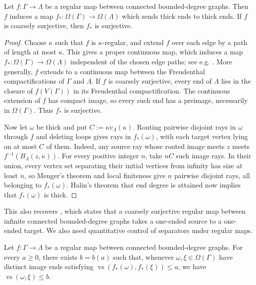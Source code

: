 \documentclass[a4paper]{amsart}
\begin{document}
\begin{lemma}\label{lem:regular-map-on-ends}
Let $f:\Gamma\to\Lambda$ be a regular map between connected bounded-degree graphs. Then $f$ induces a map $f_*:\Omega(\Gamma)\to\Omega(\Lambda)$ which sends thick ends to thick ends. If $f$ is coarsely surjective, then $f_*$ is surjective.
\end{lemma}

\begin{proof}
Choose $\kappa$ such that $f$ is $\kappa$-regular, and extend $f$ over each edge by a path of length at most $\kappa$. This gives a proper continuous map, which induces a map $f_*:\Omega(\Gamma)\to\Omega(\Lambda)$ independent of the chosen edge paths; see e.g. \cite[Prop.~I.9.11]{baues2001infinite}. More generally, $f$ extends to a continuous map between the Freudenthal compactifications of $\Gamma$ and $\Lambda$. 
If $f$ is coarsely surjective, every end of $\Lambda$ lies in the closure of $f(V(\Gamma))$ in its Freudenthal compactification. The continuous extension of $f$ has compact image, so every such end has a preimage, necessarily in $\Omega(\Gamma)$. Thus $f_*$ is surjective.

Now let $\omega$ be thick and put $C:=\kappa v_\Lambda(\kappa)$. Routing pairwise disjoint rays in $\omega$ through $f$ and deleting loops gives rays in $f_*(\omega)$, with each target vertex lying on at most $C$ of them. Indeed, any source ray whose routed image meets $z$ meets $f^{-1}(B_\Lambda(z,\kappa))$. For every positive integer $n$, take $nC$ such image rays. In their union, every vertex set separating their initial vertices from infinity has size at least $n$, so Menger's theorem and local finiteness give $n$ pairwise disjoint rays, all belonging to $f_*(\omega)$. Halin's theorem that end degree is attained \cite[p.~241]{diestel2025graph} now implies that $f_*(\omega)$ is thick.
\end{proof}

This also recovers \cite[Lem.~3.9]{mackay2026almost}, which states that a coarsely surjective regular map between infinite connected bounded-degree graphs takes a one-ended source to a one-ended target.
We also need quantitative control of separators under regular maps.

\begin{lemma}\label{lem:regular-end-separators}
Let $f:\Gamma\to\Lambda$ be a regular map between connected bounded-degree graphs.
For every $a\geq0$, there exists $b=b(a)$ such that, whenever $\omega,\xi\in\Omega(\Gamma)$ have distinct image ends satisfying $\operatorname{vs}(f_*(\omega),f_*(\xi))\leq a$, we have $\operatorname{vs}(\omega,\xi)\leq b$.
\end{lemma}
\end{document}
